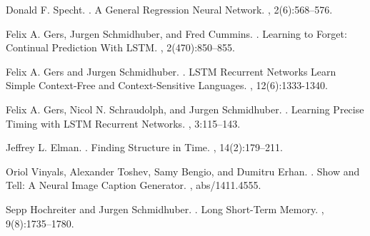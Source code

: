 \documentclass[11pt,letterpaper]{article}
\begin{document}
\begin{thebibliography}{}

Donald F. Specht.
.
\newblock A General Regression Neural Network.
,
2(6):568--576.

Felix A. Gers,  Jurgen Schmidhuber, and Fred Cummins.
.
\newblock Learning to Forget: Continual Prediction With LSTM.
,
2(470):850--855.

Felix A. Gers and Jurgen Schmidhuber.
.
\newblock LSTM Recurrent Networks Learn Simple Context-Free and Context-Sensitive Languages.
,
12(6):1333-1340.

Felix A. Gers, Nicol N. Schraudolph, and Jurgen Schmidhuber.
.
\newblock Learning Precise Timing with LSTM Recurrent Networks.
,
3:115--143.

Jeffrey L. Elman.
.
\newblock Finding Structure in Time.
,
14(2):179--211.

Oriol Vinyals, Alexander Toshev, Samy Bengio, and Dumitru Erhan.
.
\newblock Show and Tell: A Neural Image Caption Generator.
,
abs/1411.4555.

Sepp Hochreiter and Jurgen Schmidhuber.
.
\newblock Long Short-Term Memory.
,
9(8):1735--1780.

\end{thebibliography}
\end{document}
